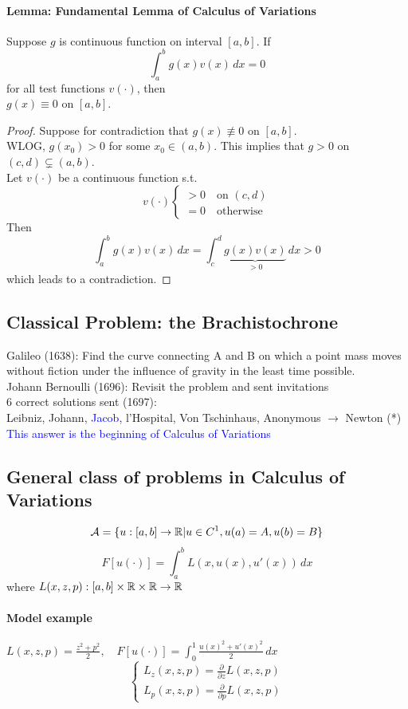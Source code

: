\documentclass[11pt]{article}
\begin{document}
\paragraph{Lemma: Fundamental Lemma of Calculus of Variations}
Suppose $g$ is continuous function on interval $[a,b]$. If
$$\int_a^b g(x)v(x) \, dx = 0$$ for all test functions $v(\cdot)$, then \\
$g(x) \equiv 0$ on $[a,b]$.\\
\begin{proof}
	Suppose for contradiction that $g(x) \not\equiv 0$ on $[a, b]$. \\
	WLOG, $g(x_0) > 0$ for some $x_0 \in (a,b)$. This implies that $g > 0$ on $(c, d) \subsetneq (a,b)$. \\
	Let $v(\cdot)$ be a continuous function s.t. 
	$$ v(\cdot) \begin{cases}
		> 0 \quad \text{on $(c,d)$} \\
		= 0 \quad \text{otherwise}
	\end{cases}$$
	Then
	$$\int_a^b g(x)v(x)\, dx = \int_c^d \underbrace{g(x) v(x)}_{>0} \, dx >0$$ which leads to a contradiction.
\end{proof}

\subsection{Classical Problem: the Brachistochrone}
Galileo (1638): Find the curve connecting A and B on which a point mass moves without fiction under the influence of gravity in the least time possible.\\
Johann Bernoulli (1696): Revisit the problem and sent invitations \\
6 correct solutions sent (1697): \\
Leibniz, Johann, \textcolor{blue}{Jacob}, l'Hospital, Von Tschinhaus, Anonymous $\rightarrow$ Newton (*)\\
\textcolor{blue}{This answer is the beginning of Calculus of Variations}


\subsection{General class of problems in Calculus of Variations}
$$\mathcal{A} = \{ u: [a,b] \rightarrow \mathbb{R} | u \in C^1, u(a) = A, u(b) = B\}$$
$$F[u(\cdot)] = \int_a^b L(x,u(x),u'(x))\,dx$$ 
where $L(x,z,p):[a,b] \times \mathbb{R} \times \mathbb{R} \rightarrow \mathbb{R}$

\paragraph{Model example}
$L(x, z, p) = \frac{z^2 + p^2}{2}, \quad F[u(\cdot)] = \int_0^1 \frac{u(x)^2 + u'(x)^2}{2} \, dx$\\
$$\begin{cases}
	L_z (x,z,p) = \frac{\partial}{\partial z} L(x,z,p) \\
	L_p (x,z,p) = \frac{\partial}{\partial p} L(x,z,p)
\end{cases}$$
\end{document}
